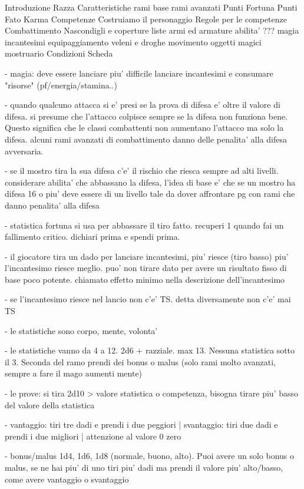 \documentclass[12pt,a4paper,twoside,openany,twocolumn]{book}
\begin{document}
Introduzione
Razza
Caratteristiche
rami base
rami avanzati
Punti Fortuna
Punti Fato
Karma
Competenze
Costruiamo il personaggio
Regole per le competenze
Combattimento
Nascondigli e coperture
liste armi ed armature
abilita' ???
magia
incantesimi
equipaggiamento
veleni e droghe
movimento
oggetti magici
mostruario
Condizioni
Scheda


- magia: deve essere lanciare piu' difficile lanciare incantesimi e consumare "risorse" (pf/energia/stamina..)

- quando qualcuno attacca si e' presi se la prova di difesa e' oltre il valore di difesa. si presume che l'attacco colpisce sempre se la difesa non funziona bene. Questo significa che le classi combattenti non aumentano l'attacco ma solo la difesa. alcuni rami avanzati di combattimento danno delle penalita' alla difesa avversaria.

- se il mostro tira la sua difesa c'e' il rischio che riesca sempre ad alti livelli. considerare abilita' che abbassano la difesa, l'idea di base e' che se un mostro ha difesa 16 o piu' deve essere di un livello tale da dover affrontare pg con rami che danno penalita' alla difesa

- statistica fortuna si usa per abbassare il tiro fatto. recuperi 1 quando fai un fallimento critico. dichiari prima e spendi prima.

- il giocatore tira un dado per lanciare incantesimi, piu' riesce (tiro basso) piu' l'incantesimo riesce meglio. puo' non tirare dato per avere un risultato fisso di base poco potente. chiamato effetto minimo nella descrizione dell'incantesimo

- se l'incantesimo riesce nel lancio non c'e' TS. detta diversamente non c'e' mai TS

- le statistiche sono corpo, mente, volonta'

- le statistiche vanno da 4 a 12. 2d6 + razziale. max 13. Nessuna statistica sotto il 3. Seconda del ramo prendi dei bonus o malus (solo rami molto avanzati, sempre a fare il mago aumenti mente)

- le prove: si tira 2d10 > valore statistica o competenza,  bisogna tirare piu' basso del valore della statistica

- vantaggio: tiri tre dadi e prendi i due peggiori  |  svantaggio: tiri due dadi e prendi i due migliori | attenzione al valore 0 zero

- bonus/malus 1d4, 1d6, 1d8 (normale, buono, alto). Puoi avere un solo bonus o malus, se ne hai piu' di uno tiri piu' dadi ma prendi il valore piu' alto/basso, come avere vantaggio o svantaggio
\end{document}

